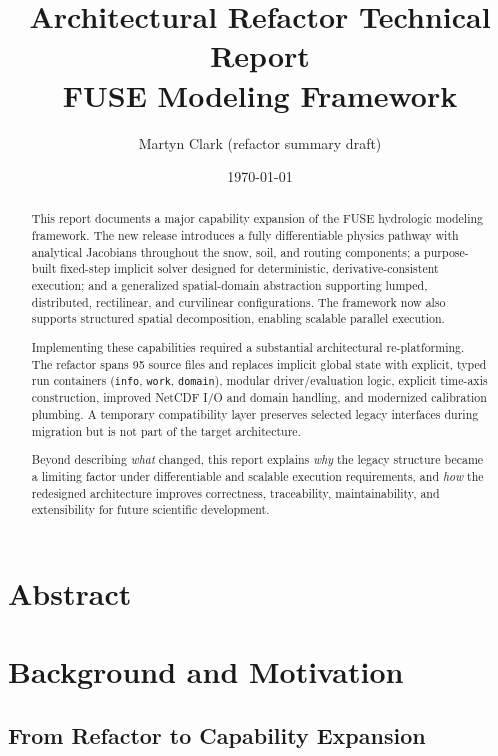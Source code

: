 \documentclass[11pt]{scrartcl}
\title{Architectural Refactor Technical Report \\ FUSE Modeling Framework}
\author{Martyn Clark (refactor summary draft)}
\date{\today}
\begin{document}
\maketitle
\tableofcontents

\section*{Abstract}

\begin{abstract}

This report documents a major capability expansion of the FUSE hydrologic modeling
framework. The new release introduces a fully differentiable physics pathway with
analytical Jacobians throughout the snow, soil, and routing components; a purpose-built
fixed-step implicit solver designed for deterministic, derivative-consistent execution;
and a generalized spatial-domain abstraction supporting lumped, distributed,
rectilinear, and curvilinear configurations. The framework now also supports structured
spatial decomposition, enabling scalable parallel execution.

Implementing these capabilities required a substantial architectural re-platforming.
The refactor spans 95 source files and replaces implicit global state with explicit,
typed run containers (\texttt{info}, \texttt{work}, \texttt{domain}), modular
driver/evaluation logic, explicit time-axis construction, improved NetCDF I/O and
domain handling, and modernized calibration plumbing. A temporary compatibility
layer preserves selected legacy interfaces during migration but is not part of the
target architecture.

Beyond describing \emph{what} changed, this report explains \emph{why} the legacy
structure became a limiting factor under differentiable and scalable execution
requirements, and \emph{how} the redesigned architecture improves correctness,
traceability, maintainability, and extensibility for future scientific development.

\end{abstract}
\section{Background and Motivation}

\subsection{From Refactor to Capability Expansion}
\end{document}
